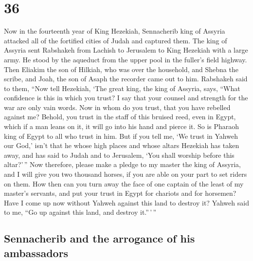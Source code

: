 \hypertarget{section-35}{%
\section{36}\label{section-35}}

 Now in the fourteenth year of King Hezekiah, Sennacherib
king of Assyria attacked all of the fortified cities of Judah and
captured them.  The king of Assyria sent Rabshakeh from
Lachish to Jerusalem to King Hezekiah with a large army. He stood by the
aqueduct from the upper pool in the fuller's field highway.
 Then Eliakim the son of Hilkiah, who was over the
household, and Shebna the scribe, and Joah, the son of Asaph the
recorder came out to him.  Rabshakeh said to them, ``Now
tell Hezekiah, `The great king, the king of Assyria, says, ``What
confidence is this in which you trust?  I say that your
counsel and strength for the war are only vain words. Now in whom do you
trust, that you have rebelled against me?  Behold, you
trust in the staff of this bruised reed, even in Egypt, which if a man
leans on it, it will go into his hand and pierce it. So is Pharaoh king
of Egypt to all who trust in him.  But if you tell me, `We
trust in Yahweh our God,' isn't that he whose high places and whose
altars Hezekiah has taken away, and has said to Judah and to Jerusalem,
`You shall worship before this altar?'\,''  Now therefore,
please make a pledge to my master the king of Assyria, and I will give
you two thousand horses, if you are able on your part to set riders on
them.  How then can you turn away the face of one captain
of the least of my master's servants, and put your trust in Egypt for
chariots and for horsemen?  Have I come up now without
Yahweh against this land to destroy it? Yahweh said to me, ``Go up
against this land, and destroy it.''\,'\,''

\hypertarget{sennacherib-and-the-arrogance-of-his-ambassadors}{%
\subsection{Sennacherib and the arrogance of his
ambassadors}\label{sennacherib-and-the-arrogance-of-his-ambassadors}}

